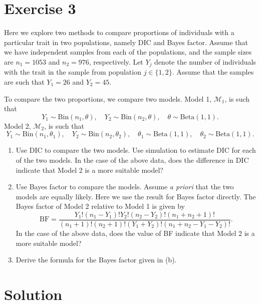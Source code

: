 \documentclass[
]{homework}
\begin{document}
\newpage

\section{Exercise 3}\label{exercise-3}

Here we explore two methods to compare proportions of individuals with a particular trait in two populations, namely DIC and Bayes factor. Assume that we have
independent samples from each of the populations, and the sample sizes are \(n_1 = 1053\) and \(n_2 = 976\), respectively. Let \(Y_j\) denote the number of individuals
with the trait in the sample from population \(j \in \{1, 2\}\). Assume that the samples are such that \(Y_1 = 26\) and \(Y_2 = 45\).

To compare the two proportions, we compare two models. Model 1, \(\mathcal M_1\), is such that
\[
  Y_1 \sim \mathrm{Bin}(n_1, \theta), \quad Y_2 \sim \mathrm{Bin}(n_2, \theta), \quad \theta \sim \mathrm{Beta}(1, 1).
\]
Model 2, \(\mathcal M_2\), is such that
\[
  Y_1 \sim \mathrm{Bin}(n_1, \theta_1), \quad Y_2 \sim \mathrm{Bin}(n_2, \theta_2), \quad \theta_1 \sim \mathrm{Beta}(1, 1), \quad \theta_2 \sim \mathrm{Beta}(1, 1).
\]

\begin{enumerate}[label = (\alph*)]
  \item Use DIC to compare the two models. Use simulation to estimate DIC for each of the two models.
  In the case of the above data, does the difference in DIC indicate that Model 2 is a more suitable model?
  
  \item Use Bayes factor to compare the models. Assume \emph{a priori} that the two models are equally likely.
  Here we use the result for Bayes factor directly. The Bayes factor of Model 2 relative to Model 1 is given by
  $$
    \mathrm{BF} = \frac{Y_1!(n_1 - Y_1)! Y_2!(n_2 - Y_2)! (n_1 + n_2 + 1)!}{(n_1 + 1)! (n_2 + 1)! (Y_1 + Y_2)! (n_1 + n_2 - Y_1 - Y_2)!}.
  $$
  In the case of the above data, does the value of BF indicate that Model 2 is a more suitable model?
  
  \item Derive the formula for the Bayes factor given in (b).
\end{enumerate}

\section{Solution}\label{solution-2}
\end{document}
